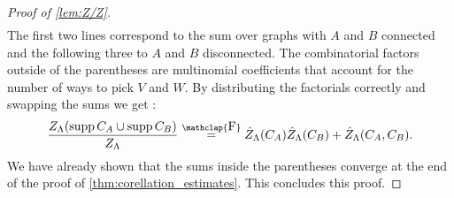 \documentclass{article}
\DeclareMathOperator{\supp}{supp}
\newcommand\formeq{\stackrel{\mathclap{\normalfont\mbox{F}}}{=}}
\begin{document}
\begin{proof}[Proof of \cref{lem:Z/Z}]
\begin{multline*}
     \end{multline*}
     The first two lines correspond to the sum over graphs with $A$ and $B$ connected and the following three to $A$ and $B$ disconnected. 
     The combinatorial factors outside of the parentheses are multinomial coefficients that account for the number of ways to pick $V$ and $W$. 
     By distributing the factorials correctly and swapping the sums we get :
     $$
     \frac{Z_\Lambda(\supp C_A\cup \supp C_B)}{Z_\Lambda}\formeq\hat Z_\Lambda(C_A)\hat Z_\Lambda(C_B)+\hat Z_\Lambda(C_A,C_B).
     $$
     We have already shown that the sums inside the parentheses converge at the end of the proof of \cref{thm:corellation_estimates}. This concludes this proof.
 \end{proof} 
 \printbibliography
\end{document}
